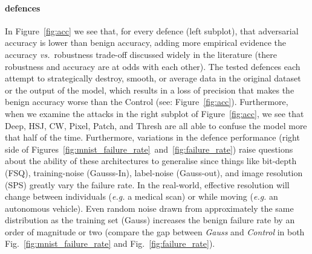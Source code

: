 \paragraph{defences}
    In Figure~\ref{fig:acc} we see that, for every defence (left subplot), that adversarial accuracy is lower than benign accuracy, adding more empirical evidence the accuracy \textit{vs.}~robustness trade-off discussed widely in the literature (\eg there robustness and accuracy are at odds with each other).
The tested defences each attempt to strategically destroy, smooth, or average data in the original dataset or the output of the model, which results in a loss of precision that makes the benign accuracy worse than the Control (see: Figure~\ref{fig:acc}).
Furthermore, when we examine the attacks in the right subplot of Figure~\ref{fig:acc}, we see that Deep, HSJ, CW, Pixel, Patch, and Thresh are all able to confuse the model more that half of the time.
Furthermore, variations in the defence performance (right side of Figures~\ref{fig:mnist_failure_rate}~and~\ref{fig:failure_rate}) raise questions about the ability of these architectures to generalise since things like bit-depth (FSQ), training-noise (Gausss-In), label-noise (Gauss-out), and image resolution (SPS) greatly vary the failure rate.
In the real-world, effective resolution will change between individuals (\textit{e.g.}
a medical scan) or while moving (\textit{e.g.}
an autonomous vehicle).
Even random noise drawn from approximately the same distribution as the training set (Gauss) increases the benign failure rate by an order of magnitude or two (compare the gap between \textit{Gauss} and \textit{Control} in both Fig.~\ref{fig:mnist_failure_rate} and Fig.~\ref{fig:failure_rate}).

